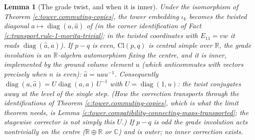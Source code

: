 \documentclass[11pt]{article}
\newtheorem{lemma}[theorem]{Lemma}
\theoremstyle{definition}
\theoremstyle{plain}
\providecommand{\C}{}\renewcommand{\C}{\mathbb{C}}
\providecommand{\Cl}{}\renewcommand{\Cl}{\mathrm{Cl}}
\providecommand{\R}{}\renewcommand{\R}{\mathbb{R}}
\begin{document}
\begin{lemma}[The grade twist, and when it is inner]\label{c:tower.grade-twist-when-it-inner}
Under the isomorphism of Theorem \ref{c:tower.commuting-copies}, the tower embedding $\iota_k$ becomes the twisted diagonal $a \mapsto \operatorname{diag}(a, \hat a)$ of \cite[Thm.~7.1]{ButlerT1} (in the corner identification of Fact \ref{c:transport.rule-1-morita-trivial}; in the twisted coordinates with $E_{11} = vw$ it reads $\operatorname{diag}(\hat a, a)$). If $p - q$ is even, $\Cl(p,q)$ is central simple over $\R$, the grade involution is an $\R$-algebra automorphism fixing the centre, and it is inner, implemented by the ground volume element $u$ (which anticommutes with vectors precisely when $n$ is even): $\hat a = u a u^{-1}$. Consequently $\operatorname{diag}(a, \hat a) = U \operatorname{diag}(a, a)\, U^{-1}$ with $U = \operatorname{diag}(1, u)$: the twist conjugates away at the level of the single step. (How the correction transports through the identifications of Theorem \ref{c:tower.commuting-copies}, which is what the limit theorem needs, is Lemma \ref{c:tower.compatibility-connecting-maps-transported}; the stagewise corrector is \emph{not} simply this $U$.) If $p - q$ is odd the grade involution acts nontrivially on the centre ($\R \oplus \R$ or $\C$) and is outer; no inner correction exists.
\end{lemma}
\end{document}

